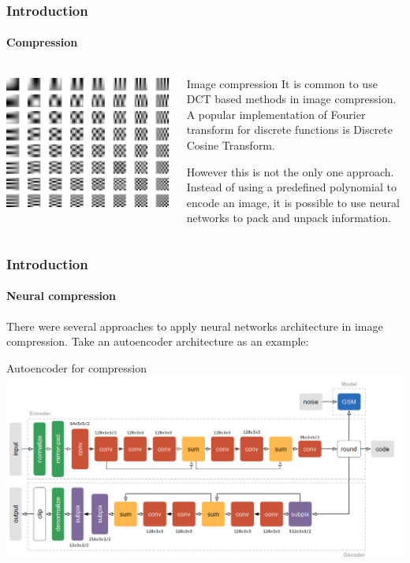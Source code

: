 \documentclass[10pt]{beamer}
\begin{document}
\begin{frame}
    \frametitle{Introduction}
    \framesubtitle{Compression}
    \begin{columns}
        \begin{column}{0.5\textwidth}
            \includegraphics[width=\textwidth]{figure/2d-dct.png}
        \end{column}
        \begin{column}{0.5\textwidth}
            \begin{block}{Image compression}
                It is common to use DCT based methods in image compression. A popular implementation of Fourier transform for discrete functions is Discrete Cosine Transform.

                However this is not the only one approach. Instead of using a predefined polynomial to encode an image, it is possible to use neural networks to pack and unpack information.
            \end{block}
        \end{column}
    \end{columns}
\end{frame}

\begin{frame}
    \frametitle{Introduction}
    \framesubtitle{Neural compression}
    There were several approaches to apply neural networks architecture in image compression. Take an autoencoder architecture as an example:
    \begin{block}{Autoencoder for compression}
        \includegraphics[width=\textwidth]{figure/neural-compression.png}
    \end{block}
\end{frame}
\end{document}
